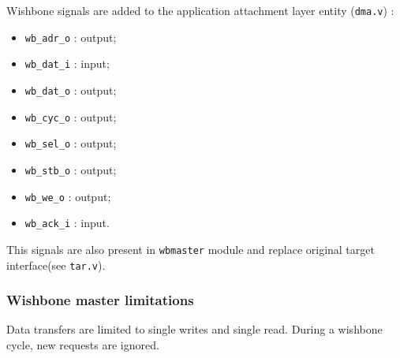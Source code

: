 \documentclass[10pt,a4paper]{cerndoc}
\begin{document}
Wishbone signals are added to the application attachment layer entity (\verb+dma.v+) :
\begin{itemize}
  \item\texttt{wb\_adr\_o} : output;
  \item\texttt{wb\_dat\_i} : input;
  \item\texttt{wb\_dat\_o} : output;
  \item\texttt{wb\_cyc\_o} : output;
  \item\texttt{wb\_sel\_o} : output;
  \item\texttt{wb\_stb\_o} : output;
  \item\texttt{wb\_we\_o} : output;
  \item\texttt{wb\_ack\_i} : input.
\end{itemize}     
   This signals are also present in \verb+wbmaster+ module and replace original target interface(see \verb+tar.v+).

\subsubsection{Wishbone master limitations}
    Data transfers are limited to single writes and single read.
    During a wishbone cycle, new requests are ignored.
\end{document}

